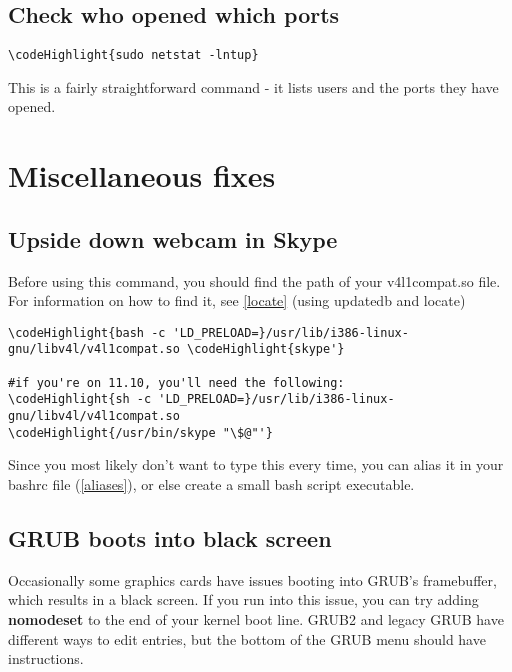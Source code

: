 \documentclass[12pt,a4paper]{article}
\begin{document}
\subsection{Check who opened which ports}
\begin{Verbatim}[commandchars=\\\{\}]
\codeHighlight{sudo netstat -lntup}
\end{Verbatim}
This is a fairly straightforward command - it lists users and the ports they have opened.

\section{Miscellaneous fixes}
\subsection{Upside down webcam in Skype}
Before using this command, you should find the path of your v4l1compat.so file. For information on how to find it, see \hyperref[locate]{\ref*{locate}} (using updatedb and locate)
\begin{Verbatim}[commandchars=\\\{\}]
\codeHighlight{bash -c 'LD_PRELOAD=}/usr/lib/i386-linux-gnu/libv4l/v4l1compat.so \codeHighlight{skype'}

#if you're on 11.10, you'll need the following:
\codeHighlight{sh -c 'LD_PRELOAD=}/usr/lib/i386-linux-gnu/libv4l/v4l1compat.so 
\codeHighlight{/usr/bin/skype "\$@"'}
\end{Verbatim}
Since you most likely don't want to type this every time, you can alias it in your bashrc file (\hyperref[aliases]{\ref*{aliases}}), or else create a small bash script executable.

\subsection{GRUB boots into black screen}
Occasionally some graphics cards have issues booting into GRUB's framebuffer, which results in a black screen.  If you run into this issue, you can try adding \textbf{nomodeset} to the end of your kernel boot line.  GRUB2 and legacy GRUB have different ways to edit entries, but the bottom of the GRUB menu should have instructions.
\end{document}
